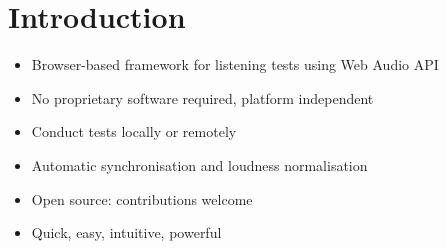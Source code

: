 \vspace{-0.8cm}
\section{Introduction}

\begin{itemize}%
	\item Browser-based framework for listening tests using Web Audio API
	\item No proprietary software required, platform independent
	\item Conduct tests locally or remotely
	\item Automatic synchronisation and loudness normalisation
	\item Open source: contributions welcome
	\item Quick, easy, intuitive, powerful
\end{itemize}